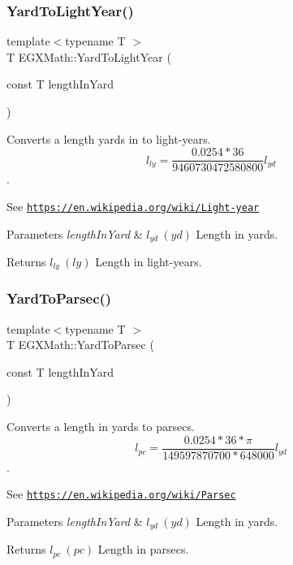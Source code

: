 \subsubsection{\texorpdfstring{Yard\+To\+Light\+Year()}{YardToLightYear()}}
{\footnotesize\ttfamily template$<$typename T $>$ \\
T E\+G\+X\+Math\+::\+Yard\+To\+Light\+Year (\begin{DoxyParamCaption}\item[{const T}]{length\+In\+Yard }\end{DoxyParamCaption})}



Converts a length yards in to light-\/years. \[ l_{ly}=\frac{0.0254 * 36}{9460730472580800} l_{yd} \]. 

See \href{https://en.wikipedia.org/wiki/Light-year}{\tt https\+://en.\+wikipedia.\+org/wiki/\+Light-\/year} 
\begin{DoxyParams}{Parameters}
{\em length\+In\+Yard} & $ l_{yd}\ (yd)$ Length in yards. \\
\hline
\end{DoxyParams}
\begin{DoxyReturn}{Returns}
$ l_{ly}\ (ly)$ Length in light-\/years. 
\end{DoxyReturn}
\mbox{\label{group___e_g_x_math-_conversions-_length_conversions-_imperial-_yard-_astronomical_ga23f43ac2cd611de8ead9af1772607dd8}} 
\subsubsection{\texorpdfstring{Yard\+To\+Parsec()}{YardToParsec()}}
{\footnotesize\ttfamily template$<$typename T $>$ \\
T E\+G\+X\+Math\+::\+Yard\+To\+Parsec (\begin{DoxyParamCaption}\item[{const T}]{length\+In\+Yard }\end{DoxyParamCaption})}



Converts a length in yards to parsecs. \[ l_{pc}=\frac{0.0254 * 36 * \pi}{149597870700 * 648000} l_{yd} \]. 

See \href{https://en.wikipedia.org/wiki/Parsec}{\tt https\+://en.\+wikipedia.\+org/wiki/\+Parsec} 
\begin{DoxyParams}{Parameters}
{\em length\+In\+Yard} & $ l_{yd}\ (yd)$ Length in yards. \\
\hline
\end{DoxyParams}
\begin{DoxyReturn}{Returns}
$ l_{pc}\ (pc)$ Length in parsecs. 
\end{DoxyReturn}
